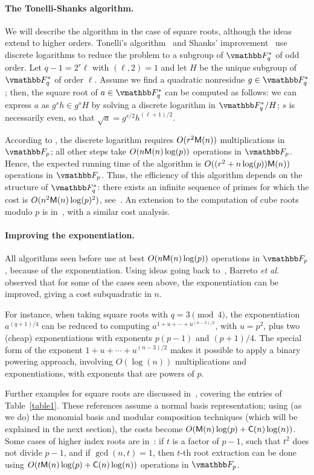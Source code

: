 \paragraph{The Tonelli-Shanks algorithm.}
We will describe the algorithm in the case of square roots, although
the ideas extend to higher orders. Tonelli's
algorithm~\cite{Tonelli1891} and Shanks' improvement~\cite{Shanks1972}
use discrete logarithms to reduce the problem to a subgroup of
$\F_q^*$ of odd order. Let $q - 1 = 2^r\ell$ with $(\ell, 2) = 1$ and
let $H$ be the unique subgroup of $\F_q^*$ of order $\ell$. Assume we
find a quadratic nonresidue $g \in \F_q^*$; then, the square root of
$a \in \F_q^*$ can be computed as follows: we can express $a$ as $g^sh
\in g^sH$ by solving a discrete logarithm in $\F_q^* / H$; $s$ is
necessarily even, so that $\sqrt{a} = g^{s / 2}h^{(\ell + 1) / 2}$.

According to \cite{Pohlig1978}, the discrete logarithm requires
$O(r^2\mathsf{M}(n))$ multiplications in $\F_p$; all other steps take
$O(n\mathsf{M}(n)\log(p))$ operations in $\F_p$. Hence, the expected running
time of the algorithm is $O((r^2 + n\log(p))\mathsf{M}(n))$ operations in
$\F_p$. Thus, the efficiency of this algorithm depends on the
structure of $\F_q^*$: there exists an infinite sequence of primes for
which the cost is $O(n^2\mathsf{M}(n)\log(p)^2)$, see~\cite{Tornaria2002}.  An
extension to the computation of cube roots modulo $p$ is
in~\cite{PaSa02}, with a similar cost analysis.

\paragraph{Improving the exponentiation.}
All algorithms seen before use at best $O(n\mathsf{M}(n)\log(p))$ operations
in $\F_p$, because of the exponentiation. Using ideas going back
to~\cite{ItTs88}, Barreto {\it et al.}~\cite{BaKiLySc02} observed that
for some of the cases seen above, the exponentiation can be improved,
giving a cost subquadratic in $n$.

For instance, when taking square roots with $q = 3 \pmod 4$, the
exponentiation $a^{(q+1)/4}$ can be reduced to computing
$a^{1+u+\cdots+u^{(n-3)/2}}$, with $u=p^2$, plus two (cheap)
exponentiations with exponents $p(p-1)$ and $(p+1)/4$. The special
form of the exponent $1+u+\cdots+u^{(n-3)/2}$ makes it possible to
apply a binary powering approach, involving $O(\log(n))$
multiplications and exponentiations, with exponents that are powers of
$p$.

Further examples for square roots are discussed
in~\cite{KoCaYuLi06,HaChKi09}, covering the entries of
Table~\ref{table1}. These references assume a normal basis
representation; using (as we do) the monomial basis and modular
composition techniques (which will be explained in the next section),
the costs become $O(\mathsf{M}(n)\log(p)+\mathsf{C}(n)\log(n))$. Some cases of higher
index roots are in~\cite{BaVo06}: if $t$ is a factor of $p-1$, such
that $t^2$ does not divide $p-1$, and if $\gcd(n,t)=1$, then $t$-th
root extraction can be done using $O(t\mathsf{M}(n)\log(p)+\mathsf{C}(n)\log(n))$
operations in $\F_p$.


